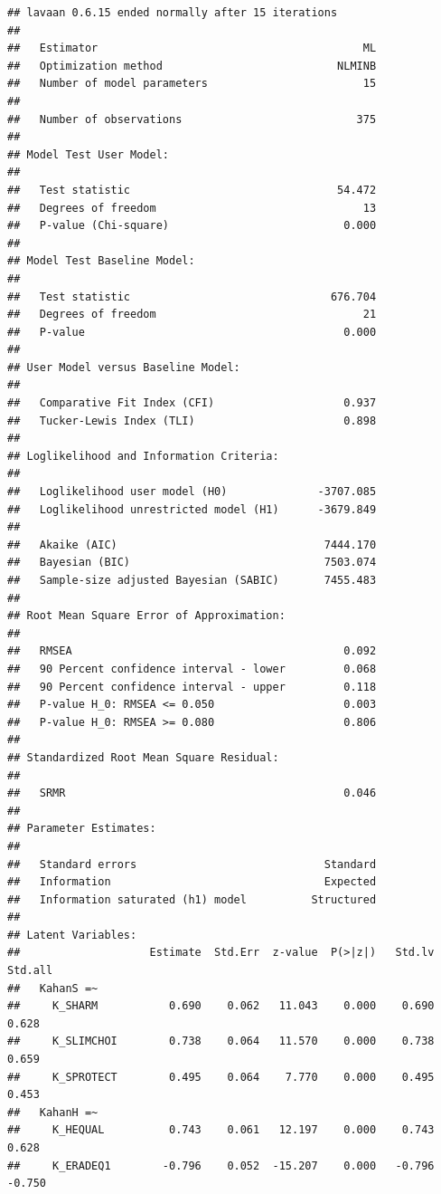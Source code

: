 \documentclass[
]{article}
\begin{document}
\begin{verbatim}
## lavaan 0.6.15 ended normally after 15 iterations
## 
##   Estimator                                         ML
##   Optimization method                           NLMINB
##   Number of model parameters                        15
## 
##   Number of observations                           375
## 
## Model Test User Model:
##                                                       
##   Test statistic                                54.472
##   Degrees of freedom                                13
##   P-value (Chi-square)                           0.000
## 
## Model Test Baseline Model:
## 
##   Test statistic                               676.704
##   Degrees of freedom                                21
##   P-value                                        0.000
## 
## User Model versus Baseline Model:
## 
##   Comparative Fit Index (CFI)                    0.937
##   Tucker-Lewis Index (TLI)                       0.898
## 
## Loglikelihood and Information Criteria:
## 
##   Loglikelihood user model (H0)              -3707.085
##   Loglikelihood unrestricted model (H1)      -3679.849
##                                                       
##   Akaike (AIC)                                7444.170
##   Bayesian (BIC)                              7503.074
##   Sample-size adjusted Bayesian (SABIC)       7455.483
## 
## Root Mean Square Error of Approximation:
## 
##   RMSEA                                          0.092
##   90 Percent confidence interval - lower         0.068
##   90 Percent confidence interval - upper         0.118
##   P-value H_0: RMSEA <= 0.050                    0.003
##   P-value H_0: RMSEA >= 0.080                    0.806
## 
## Standardized Root Mean Square Residual:
## 
##   SRMR                                           0.046
## 
## Parameter Estimates:
## 
##   Standard errors                             Standard
##   Information                                 Expected
##   Information saturated (h1) model          Structured
## 
## Latent Variables:
##                    Estimate  Std.Err  z-value  P(>|z|)   Std.lv  Std.all
##   KahanS =~                                                             
##     K_SHARM           0.690    0.062   11.043    0.000    0.690    0.628
##     K_SLIMCHOI        0.738    0.064   11.570    0.000    0.738    0.659
##     K_SPROTECT        0.495    0.064    7.770    0.000    0.495    0.453
##   KahanH =~                                                             
##     K_HEQUAL          0.743    0.061   12.197    0.000    0.743    0.628
##     K_ERADEQ1        -0.796    0.052  -15.207    0.000   -0.796   -0.750

\end{verbatim}
\end{document}
